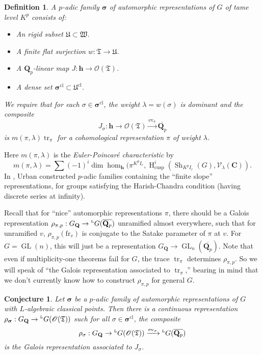 \documentclass[oneside]{amsart}
\DeclareMathOperator{\GL}{GL}
\DeclareMathOperator{\h}{H}
\DeclareMathOperator{\shimura}{Sh}
\DeclareMathOperator{\trace}{tr}
\newcommand{\dC}{\mathbf{C}}
\newcommand{\dQ}{\mathbf{Q}}
\newcommand{\dsigma}{{\bm\sigma}}
\newcommand{\fT}{\mathfrak{T}}
\newcommand{\fU}{\mathfrak{U}}
\newcommand{\fW}{\mathfrak{W}}
\newcommand{\sO}{\mathscr{O}}
\newcommand{\sV}{\mathscr{V}}
\newcommand{\arithfrob}{\mathrm{fr}}
\newcommand{\classical}{\mathrm{cl}}
\newcommand{\cusp}{\mathrm{cusp}}
\newcommand{\hida}{\mathbf{h}}
\newcommand{\langlands}[1]{\prescript{\textnormal{\tiny L}}{}{#1}}
\newtheorem*{conjecture*}{Conjecture}
\newtheorem*{definition*}{Definition}
\begin{document}
\begin{definition*}
A \emph{$p$-adic family $\dsigma$ of automorphic representations of $G$ of 
tame level $K^p$} consists of:
\begin{itemize}
  \item An rigid subset $\fU\subset \fW$. 
  \item A finite flat surjection $w:\fT\to \fU$. 
  \item A $\dQ_p$-linear map $J:\hida\to \sO(\fT)$.
  \item A dense set $\dsigma^\classical\subset\fU^\classical$. 
\end{itemize}
We require that for each $\sigma\in \dsigma^\classical$, the weight 
$\lambda=w(\sigma)$ is dominant and the composite 
\[
  J_\sigma:\hida \to \sO(\fT) \xrightarrow{\mathrm{ev}_\sigma} \overline{\dQ_p}
\]
is $m(\pi,\lambda) \trace_\pi$ for a cohomological representation $\pi$ of 
weight $\lambda$. 
\end{definition*}
Here $m(\pi,\lambda)$ is the \emph{Euler-Poincar\'e characteristic} 
by 
\[
  m(\pi,\lambda) = \sum (-1)^i \dim\hom_\hida(\pi^{K^p I_r},\h_\cusp^i(\shimura_{K^p I_r}(G),\sV_\lambda(\dC)) .
\]
In \cite{urban-2011}, Urban constructed $p$-adic families containing the 
``finite slope'' representations, for groups satisfying the Harish-Chandra 
condition (having discrete series at infinity). 

Recall that for ``nice'' automorphic representations $\pi$, there should 
be a Galois representation 
$\rho_{\pi,p}:G_\dQ\to \langlands G(\overline{\dQ_p})$ unramified almost 
everywhere, such that for unramified $v$, 
$\rho_{\pi,p}(\arithfrob_v)$ is conjugate to the Satake parameter of $\pi$ 
at $v$. For $G=\GL(n)$, this will just be a representation 
$G_\dQ\to \GL_n(\overline{\dQ_p})$. Note that even if multiplicity-one theorems 
fail for $G$, the trace $\trace_\pi$ determines $\rho_{\pi,p}$. So we will 
speak of ``the Galois representation associated to $\trace_\pi$,'' bearing in 
mind that we don't currently know how to construct $\rho_{\pi,p}$ for general 
$G$. 

\begin{conjecture*}
Let $\dsigma$ be a $p$-adic family of automorphic representations of $G$ with 
$L$-algebraic classical points. Then there is a continuous representation 
$\rho_\dsigma:G_\dQ\to \langlands G(\sO(\fT))$ such for all 
$\sigma\in \dsigma^\classical$, the composite 
\[
  \rho_\sigma:G_\dQ\to \langlands G(\sO(\fT)) \xrightarrow{\mathrm{ev}_\sigma} \langlands G(\overline{\dQ_p}) 
\]
is the Galois representation associated to $J_\sigma$.
\end{conjecture*}
\end{document}
